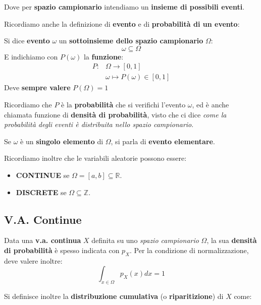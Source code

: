 Dove per \textbf{spazio campionario} intendiamo 
un \textbf{insieme di possibili eventi}. 

Ricordiamo anche la definizione di \textbf{evento} 
e di \textbf{probabilità di un evento}:

\begin{definition}
    Si dice \textbf{evento} $\omega $ un 
    \textbf{sottoinsieme dello spazio campionario} $\Omega $:
    \[
        \omega \subseteq \Omega 
    \]
    E indichiamo con $P(\omega)$ la \textbf{funzione}:
    \[
        \begin{aligned}
            P: &\Omega \to [0,1] \\ 
               &\omega \mapsto P(\omega ) \in [0,1]
        \end{aligned}
    \]
    Deve \textbf{sempre valere} $P(\Omega) = 1$
\end{definition}

Ricordiamo che $P$ è la \textbf{probabilità} che si 
verifichi l'evento $\omega$, ed è anche chiamata funzione
di \textbf{densità di probabilità}, visto che ci dice
\textit{come la probabilità degli eventi è distribuita nello spazio campionario}.

\begin{remark}
    Se $\omega $ è un \textbf{singolo elemento} di $\Omega $, si
    parla di \textbf{evento elementare}.
\end{remark}

Ricordiamo inoltre che le variabili aleatorie possono essere:
\begin{itemize}
    \item \textbf{CONTINUE} se $\Omega  = [a,b] \subseteq \mathbb{R}$.
    \item \textbf{DISCRETE} se $\Omega  \subseteq \mathbb{Z}$.
\end{itemize}

\subsection{V.A. Continue}

Data una \textbf{v.a. continua} $X$ definita su uno \textit{spazio campionario} $\Omega $, 
la sua \textbf{densità di probabilità} è spesso indicata con $p_X$.
Per la condizione di normalizzazione, deve valere inoltre:
\[
    \int_{x\in \Omega} p_X(x) dx = 1
\]

Si definisce inoltre la \textbf{distribuzione cumulativa} (o \textbf{riparitizione}) 
di $X$ come:


